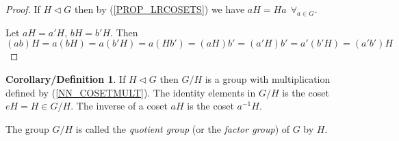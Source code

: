 \documentclass[12pt, letterpaper, oneside]{article}
\theoremstyle{plain}
\theoremstyle{definition}
\newtheorem{cordef}[theorem]{Corollary/Definition}
\newcommand{\vs}{\vskip 5mm}
\begin{document}
\begin{proof}
If $H\lhd G$ then by  (\ref{PROP_LRCOSETS}) we have $aH = Ha\ \ \forall_{a\in G}$.

Let $aH = a'H$, $bH = b'H$. Then
$$(ab)H = a(bH) = a(b'H) = a(Hb') = (aH)b' = (a'H)b' = a'(b'H)=(a'b')H$$ 
\end{proof}

\vs 

\begin{cordef}
If $H\lhd G$ then $G/H$ is a group with multiplication defined by (\ref{NN_COSETMULT}). The identity 
elements in $G/H$ is the coset $eH = H \in G/H$. The inverse of a coset $aH$ is the coset $a^{-1}H$.

The group $G/H$ is called the \emph{quotient group} (or the \emph{factor group}) of $G$ by $H$. 
\end{cordef}

\vs
\end{document}
